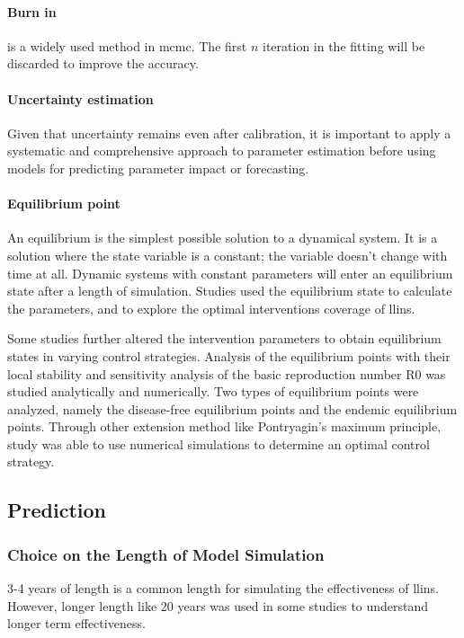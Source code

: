 \documentclass[a4paper, 12pt, twoside]{article}
\begin{document}
\paragraph{Burn in}%
\label{par:burn_in}
is a widely used method in \gls{mcmc}. The first $n$ iteration in the fitting will be discarded to improve the accuracy.

\paragraph{Uncertainty estimation}
Given that uncertainty remains even after calibration, it is important to apply a systematic and comprehensive approach to parameter estimation before using models for predicting parameter impact or forecasting.

\paragraph{Equilibrium point}%
\label{par:equilibrium_point}
An equilibrium is the simplest possible solution to a dynamical system.
It is a solution where the state variable is a constant; the variable doesn't change with time at all.
Dynamic systems with constant parameters will enter an equilibrium state after a length of simulation.
Studies\cite{Handari2020, Nwankwo2019,NiazArifin2013,Heesterbeek2015a,Karl2016,Olaniyi2020,Stuckey2014,Tompkins2013,Tompkins2013,Mbogo2018,Winskill2019,Smith2019,Briet2013} used the equilibrium state to calculate the parameters, and to explore the optimal interventions coverage of \gls{llins}.

Some studies further altered the intervention parameters to obtain equilibrium states in varying control strategies.
Analysis of the equilibrium points with their local stability and sensitivity analysis of the basic reproduction number \gls{R0} was studied analytically and numerically.
Two types of equilibrium points were analyzed, namely the disease-free equilibrium points and the endemic equilibrium points.
Through other extension method like Pontryagin’s maximum principle, study was able to use numerical simulations to determine an optimal control strategy\cite{Tchoumi2020}.

\subsection{Prediction}%
\label{sub:prediction}

\subsubsection{Choice on the Length of Model Simulation}
3-4 years of length is a common length for simulating the effectiveness of \gls{llins}. However, longer length like 20 years was used in some studies to understand longer term effectiveness\cite{Walker2016}.
\end{document}
